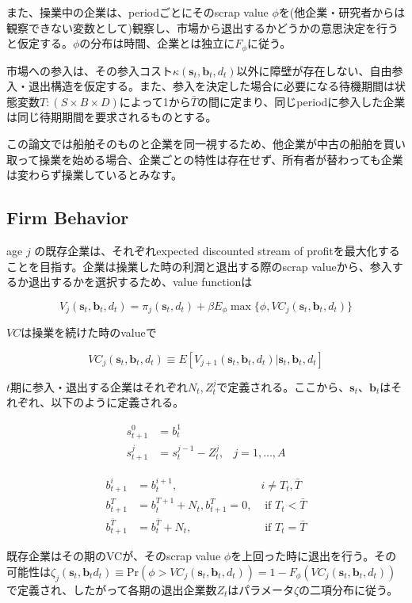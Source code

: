 \documentclass[11pt]{jsarticle}
\begin{document}
また、操業中の企業は、periodごとにそのscrap value $\phi$を(他企業・研究者からは観察できない変数として)観察し、市場から退出するかどうかの意思決定を行うと仮定する。$\phi$の分布は時間、企業とは独立に$F_{\phi}$に従う。

市場への参入は、その参入コスト$\kappa(\mathbf{s}_t, \mathbf{b}_t, d_t)$以外に障壁が存在しない、自由参入・退出構造を仮定する。また、参入を決定した場合に必要になる待機期間は状態変数$T:(S \times B \times D)$によって1から$\bar{T}$の間に定まり、同じperiodに参入した企業は同じ待期期間を要求されるものとする。

この論文では船舶そのものと企業を同一視するため、他企業が中古の船舶を買い取って操業を始める場合、企業ごとの特性は存在せず、所有者が替わっても企業は変わらず操業しているとみなす。

\subsection{Firm Behavior}

age $j$ の既存企業は、それぞれexpected discounted stream of profitを最大化することを目指す。企業は操業した時の利潤と退出する際のscrap valueから、参入するか退出するかを選択するため、value functionは

\[
V_j(\mathbf{s}_t, \mathbf{b}_t, d_t) = \pi_j(\mathbf{s}_t, d_t) + \beta E_{\phi} \max \{ \phi, VC_j(\mathbf{s}_t, \mathbf{b}_t, d_t) \}
\]

$VC$は操業を続けた時のvalueで

\[
VC_j(\mathbf{s}_t, \mathbf{b}_t, d_t) \equiv E[V_{j+1}(\mathbf{s}_t, \mathbf{b}_t, d_t) | \mathbf{s}_t, \mathbf{b}_t, d_t]
\]

$t$期に参入・退出する企業はそれぞれ$N_t, Z_t^j$で定義される。ここから、$\mathbf{s}_t$、$\mathbf{b}_t$はそれぞれ、以下のように定義される。

\begin{align*}
  s_{t+1}^0 &= b_{t}^1 & \\
  s_{t+1}^j &= s_t^{j-1} - Z_t^j, & j = 1, \ldots, A
\end{align*}

\begin{align*}
  b_{t+1}^i &= b_t^{i+1}, & i \neq T_t, \bar{T} \\
  b_{t+1}^T &= b_t^{T+1} + N_t, b_{t+1}^T = 0, & \text{ if }T_t < \bar{T}\\
  b_{t+1}^{\bar{T}} &= b_t^{\bar{T}} + N_t, & \text{ if }T_t = \bar{T}
\end{align*}

既存企業はその期のVCが、そのscrap value $\phi$を上回った時に退出を行う。その可能性は$\zeta_j (\mathbf{s}_t, \mathbf{b}_t d_t) \equiv \text{Pr}(\phi > VC_j(\mathbf{s}_t, \mathbf{b}_t, d_t)) = 1 - F_{\phi}(VC_j(\mathbf{s}_t, \mathbf{b}_t, d_t))$で定義され、したがって各期の退出企業数$Z_t$はパラメータ$\zeta$の二項分布に従う。
\end{document}
